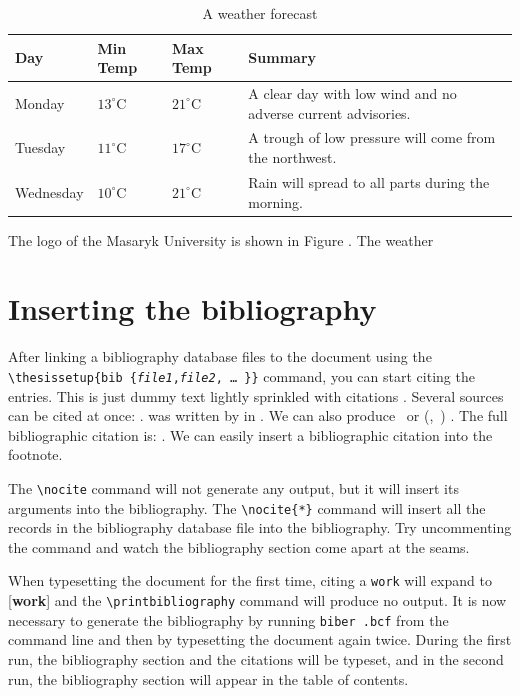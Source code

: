 \documentclass[
  digital, %
  table,   %
  lof,     %
  lot,     %
]{fithesis3}
\begin{document}
\begin{table}
  \begin{tabularx}{\textwidth}{lllX}
    \toprule
    Day & Min Temp & Max Temp & Summary \\
    \midrule
    Monday & $13^{\circ}\mathrm{C}$ & $21^\circ\mathrm{C}$ & A
    clear day with low wind and no adverse current advisories. \\
    Tuesday & $11^{\circ}\mathrm{C}$ & $17^\circ\mathrm{C}$ & A
    trough of low pressure will come from the northwest. \\
    Wednesday & $10^{\circ}\mathrm{C}$ &
    $21^\circ\mathrm{C}$ & Rain will spread to all parts during the
    morning. \\
    \bottomrule
  \end{tabularx}
  \caption{A weather forecast}
  \label{tab:weather}
\end{table}

The logo of the Masaryk University is shown in Figure \pageref{fig:mulogo2}. The weather

\shorthandon{-}

\chapter{Inserting the bibliography}
After linking a bibliography data\-base files to the document using
the \verb"\"\texttt{thesissetup\{bib\discretionary{=}{=}{=}%
\{\textit{file1},\textit{file2},\,\ldots\,\}\}} command, you can
start citing the entries. This is just dummy text
\parencite{borgman03} lightly sprinkled with citations
\parencite[p.~123]{greenberg98}. Several sources can be cited at
once: \cite{borgman03,greenberg98,thanh01}.
 was written by \citeauthor{greenberg98} in
\citeyear{greenberg98}. We can also produce \textcite{greenberg98}%
\ or %
\def\citeauthoryear#1{(\textcite{#1},~\citeyear{#1})}%
\citeauthoryear{greenberg98}%
. The full bibliographic citation is:
\emph{}. We can easily insert a bibliographic
citation into the footnote.

The \verb"\nocite" command will not generate any
output\nocite{muni}, but it will insert its arguments into
the bibliography. The \verb"\nocite{*}" command will insert all the
records in the bibliography database file into the bibliography.
Try uncommenting the command
and watch the bibliography section come apart at the seams.

When typesetting the document for the first time, citing a
\texttt{work} will expand to [\textbf{work}] and the
\verb"\printbibliography" command will produce no output. It is now
necessary to generate the bibliography by running \texttt{biber
\jobname.bcf} from the command line and then by typesetting the
document again twice. During the first run, the bibliography
section and the citations will be typeset, and in the second run,
the bibliography section will appear in the table of contents.
\end{document}
